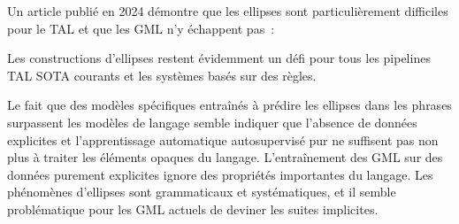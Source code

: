 {Un article publié en 2024 démontre que les ellipses sont particulièrement difficiles pour le TAL et que les GML n'y échappent pas~:
 {
\item[][---] Les constructions d'ellipses restent évidemment un défi pour tous les pipelines TAL SOTA courants et les systèmes basés sur des règles.
\item[][---] Le fait que des modèles spécifiques entraînés à prédire les ellipses dans les phrases surpassent les modèles de langage semble indiquer que l'absence de données explicites et l'apprentissage automatique autosupervisé pur ne suffisent pas non plus à traiter les éléments opaques du langage. L'entraînement des GML sur des données purement explicites ignore des propriétés importantes du langage. Les phénomènes d'ellipses sont grammaticaux et systématiques, et il semble problématique pour les GML actuels de deviner les suites implicites.
}{\cite{cavar_computing_2024}}
\vspace{-1\baselineskip}
}{}

